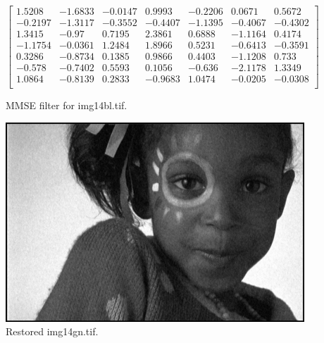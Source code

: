 \documentclass{article}
\begin{document}
\begin{figure}[H]
    \begin{equation*}
        \begin{bmatrix}
        1.5208 & -1.6833 & -0.0147 & 0.9993 & -0.2206 & 0.0671 & 0.5672\\
        -0.2197 & -1.3117 & -0.3552 & -0.4407 & -1.1395 & -0.4067 & -0.4302\\
        1.3415 & -0.97 & 0.7195 & 2.3861 & 0.6888 & -1.1164 & 0.4174\\
        -1.1754 & -0.0361 & 1.2484 & 1.8966 & 0.5231 & -0.6413 & -0.3591\\
        0.3286 & -0.8734 & 0.1385 & 0.9866 & 0.4403 & -1.1208 & 0.733\\
        -0.578 & -0.7402 & 0.5593 & 0.1056 & -0.636 & -2.1178 & 1.3349\\
        1.0864 & -0.8139 & 0.2833 & -0.9683 & 1.0474 & -0.0205 & -0.0308\\
        \end{bmatrix}
    \end{equation*}
\caption{MMSE filter for img14bl.tif.}
\end{figure}
\begin{figure}[H]
    \centering
    \includegraphics[width=1\textwidth]{../1-img14gn-restored.png}
    \caption{Restored img14gn.tif.}
\end{figure}
\end{document}
